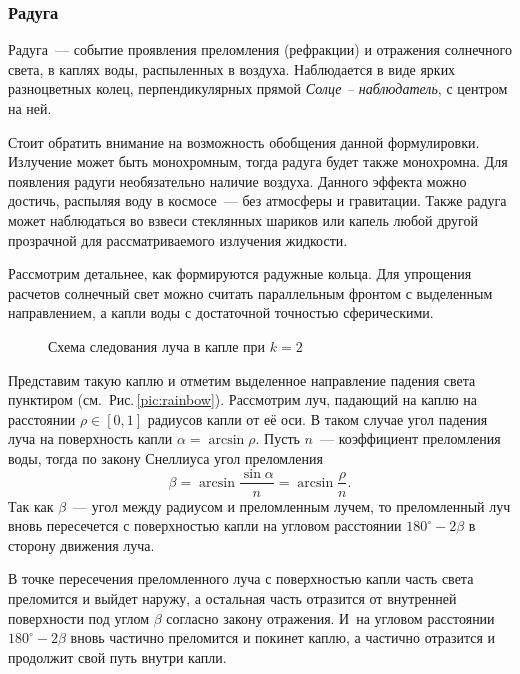 \subsubsection{Радуга}
\label{sec:rainbow}




Радуга~--- событие проявления преломления (рефракции) и отражения солнечного света, в каплях воды, распыленных в воздуха. Наблюдается в виде ярких разноцветных колец, перпендикулярных прямой \textsl{Солце -- наблюдатель}, с центром на ней. 

Стоит обратить внимание на возможность обобщения данной формулировки. Излучение может быть монохромным, тогда радуга будет также монохромна. Для появления радуги необязательно наличие воздуха. Данного эффекта можно достичь, распыляя воду в космосе~--- без атмосферы и гравитации. Также радуга может наблюдаться во взвеси стеклянных шариков или капель любой другой прозрачной для рассматриваемого излучения жидкости.

Рассмотрим детальнее, как формируются радужные кольца. Для упрощения расчетов солнечный свет можно считать параллельным фронтом с выделенным направлением, а капли воды с достаточной точностью сферическими. 

\begin{wrapfigure}[13]{r}{0.47\tw}
    \vspace{-1.5pc}
    
    \caption{Схема следования луча в капле при $k=2$}
\end{wrapfigure}
Представим такую каплю и отметим выделенное направление падения света пунктиром (см.~Рис.\,\ref{pic:rainbow}). Рассмотрим луч, падающий на каплю на расстоянии $\rho \in [0,1]$ радиусов капли от её оси. В таком случае угол падения луча на поверхность капли $\alpha = \arcsin \rho$. Пусть $n$~--- коэффициент преломления воды, тогда по закону Снеллиуса угол преломления 
\begin{equation*}
    \beta = \arcsin \frac{\sin{\alpha}}{n} = \arcsin \frac{\rho}{n}.
\end{equation*}
Так как $\beta$~--- угол между радиусом и преломленным лучем, то преломленный луч вновь пересечется с поверхностью капли на угловом расстоянии $180^\circ - 2\beta$ в сторону движения луча. 

В точке пересечения преломленного луча с поверхностью капли часть света преломится и выйдет наружу, а остальная часть отразится от внутренней поверхности под углом $\beta$ согласно закону отражения. И~на угловом расстоянии $180^\circ - 2\beta$ вновь частично преломится и покинет каплю, а частично отразится и продолжит свой путь внутри капли.


